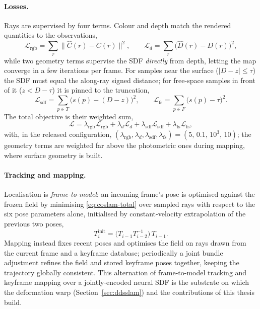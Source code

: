 \documentclass{article}
\begin{document}
\paragraph{Losses.} Rays are supervised by four terms. Colour and depth match the rendered quantities to the observations,
\begin{equation}
    \mathcal{L}_{\text{rgb}} = \sum_r \big\lVert \hat{C}(r) - C(r) \big\rVert^2,
    \qquad
    \mathcal{L}_{d} = \sum_r \big( \hat{D}(r) - D(r) \big)^2,
    \label{eq:coslam-photo}
\end{equation}
while two geometry terms supervise the SDF \emph{directly} from depth, letting the map converge in a few iterations per frame. For samples near the surface ($|D - z| \le \tau$) the SDF must equal the along-ray signed distance; for free-space samples in front of it ($z < D - \tau$) it is pinned to the truncation,
\begin{equation}
    \mathcal{L}_{\text{sdf}} = \sum_{p \in T} \big( s(p) - (D - z) \big)^2,
    \qquad
    \mathcal{L}_{\text{fs}} = \sum_{p \in F} \big( s(p) - \tau \big)^2 .
    \label{eq:coslam-sdf}
\end{equation}
The total objective is their weighted sum,
\begin{equation}
    \mathcal{L} = \lambda_{\text{rgb}}\mathcal{L}_{\text{rgb}}
    + \lambda_{d}\mathcal{L}_{d}
    + \lambda_{\text{sdf}}\mathcal{L}_{\text{sdf}}
    + \lambda_{\text{fs}}\mathcal{L}_{\text{fs}},
    \label{eq:coslam-total}
\end{equation}
with, in the released configuration, $(\lambda_{\text{rgb}},\lambda_{d},\lambda_{\text{sdf}},\lambda_{\text{fs}}) = (5,\,0.1,\,10^3,\,10)$; the geometry terms are weighted far above the photometric ones during mapping, where surface geometry is built.

\paragraph{Tracking and mapping.} Localisation is \emph{frame-to-model}: an incoming frame's pose is optimised against the frozen field by minimising \eqref{eq:coslam-total} over sampled rays with respect to the six pose parameters alone, initialised by constant-velocity extrapolation of the previous two poses,
\begin{equation}
    T_i^{\text{init}} = \big(T_{i-1} T_{i-2}^{-1}\big)\, T_{i-1}.
    \label{eq:const-vel}
\end{equation}
Mapping instead fixes recent poses and optimises the field on rays drawn from the current frame and a keyframe database; periodically a joint bundle adjustment refines the field and stored keyframe poses together, keeping the trajectory globally consistent. This alternation of frame-to-model tracking and keyframe mapping over a jointly-encoded neural SDF is the substrate on which the deformation warp (Section~\ref{sec:ddsslam}) and the contributions of this thesis build.
\end{document}
